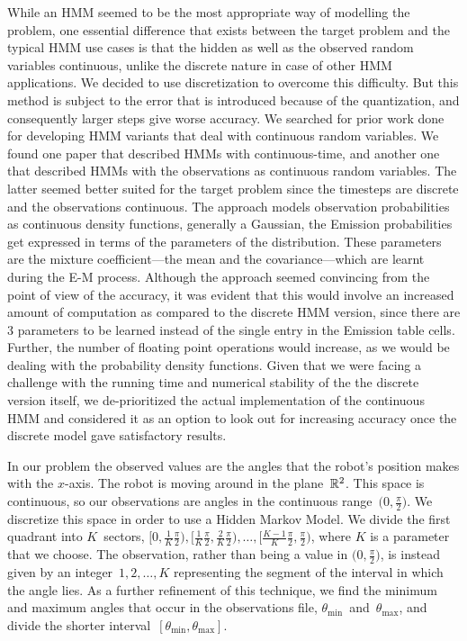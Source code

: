 \documentclass[twoside]{article}
\begin{document}
While an HMM seemed to be the most appropriate way of modelling the problem, one essential difference that exists between the target problem and the typical HMM use cases is that the hidden as well as the observed random variables continuous, unlike the discrete nature in case of other HMM applications.
We decided to use discretization to overcome this difficulty.
But this method is subject to the error that is introduced because of the quantization, and consequently larger steps give worse accuracy.
We searched for prior work done for developing HMM variants that deal with continuous random variables.
We found one paper that described HMMs with continuous-time, and another one that described HMMs with the observations as continuous random variables.
The latter seemed better suited for the target problem since the timesteps are discrete and the observations continuous.
The approach models observation probabilities as continuous density functions, generally a Gaussian, the Emission probabilities get expressed in terms of the parameters of the distribution.
These parameters are the mixture coefficient---the mean and the covariance---which are learnt during the E-M process.
Although the approach seemed convincing from the point of view of the accuracy, it was evident that this would involve an increased amount of computation as compared to the discrete HMM version, since there are 3 parameters to be learned instead of the single entry in the Emission table cells.
Further, the number of floating point operations would increase, as we would be dealing with the probability density functions.
Given that we were facing a challenge with the running time and numerical stability of the the discrete version itself, we de-prioritized the actual implementation of the continuous HMM and considered it as an option to look out for increasing accuracy once the discrete model gave satisfactory results.

In our problem the observed values are the angles that the robot's position makes with the $x$-axis.
The robot is moving around in the plane~$\mathbb{R}^2$.
This space is continuous, so our observations are angles in the continuous range~$\big(0, \frac{\pi}{2}\big)$.
We discretize this space in order to use a Hidden Markov Model.
We divide the first quadrant into $K$~sectors, ${\textstyle \big[0, \frac{1}{K}\frac{\pi}{2}\big), \big[\frac{1}{K}\frac{\pi}{2}, \frac{2}{K}\frac{\pi}{2}\big), \ldots, \big[\frac{K - 1}{K}\frac{\pi}{2}, \frac{\pi}{2}\big)}$, where $K$ is a parameter that we choose.
The observation, rather than being a value in $\big(0, \frac{\pi}{2}\big)$, is instead given by an integer~${1, 2, \ldots, K}$ representing the segment of the interval in which the angle lies.
As a further refinement of this technique, we find the minimum and maximum angles that occur in the observations file, $\theta_{\text{min}}$~and~$\theta_{\text{max}}$, and divide the shorter interval~$[\theta_{\text{min}}, \theta_{\text{max}}]$.
\end{document}
